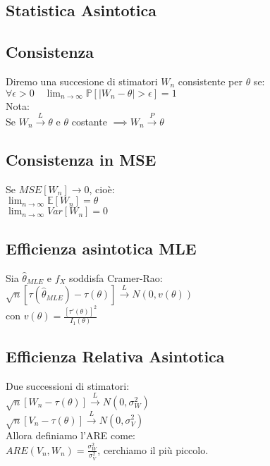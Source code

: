 \documentclass[a4paper,notitlepage]{report}%
\newcommand{\p}{\mathbb{P}} %
\newcommand{\E}{\mathbb{E}} %
\begin{document}
\begin{multicols*}{2}
\section*{Statistica Asintotica}


    \subsection*{Consistenza}
    Diremo una succesione di stimatori $W_n$ consistente per $\theta$ se:\\
    $\forall\epsilon > 0 \quad \lim_{n\to\infty} \p[|W_n-\theta|>\epsilon]=1$\\
    Nota:\\
    Se $W_n \overset{L}{\to} \theta$ e $\theta$ costante
    $\implies W_n \overset{P}{\to} \theta$


    \subsection*{Consistenza in MSE}
    Se $MSE[W_n]\to0$, cioè:\\
    $\lim_{n\to\infty} \E[W_n]=\theta$ \\
    $\lim_{n\to\infty} Var[W_n] = 0$


    \subsection*{Efficienza asintotica MLE}
    Sia $\hat{\theta}_{MLE}$ e $f_X$ soddisfa Cramer-Rao:\\
    $\sqrt{n}[\tau(\hat{\theta}_{MLE}) - \tau(\theta)]\overset{L}{\to} N(0,v(\theta))$\\
    con $v(\theta)=\frac{[\tau'(\theta)]^2}{I_1(\theta)}$


    \subsection*{Efficienza Relativa Asintotica}
    Due successioni di stimatori:\\
    $\sqrt{n}[W_n-\tau(\theta)]\overset{L}{\to} N(0,\sigma^2_W)$ \\
    $\sqrt{n}[V_n-\tau(\theta)]\overset{L}{\to} N(0,\sigma^2_V)$ \\
    Allora definiamo l'ARE come:\\
    $ARE(V_n,W_n)=\frac{\sigma^2_W}{\sigma^2_V}$,
    cerchiamo il più piccolo.




\end{multicols*}
\end{document}
